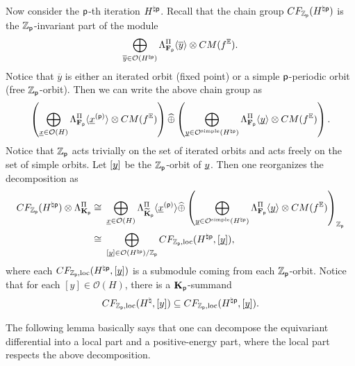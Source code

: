 \documentclass[reqno, 10pt]{amsart}
\numberwithin{equation}{section}
\numberwithin{equation}{section}
\renewcommand{\subset}{\subseteq}
\theoremstyle{definition}
\theoremstyle{remark}
\newcommand{\beqn}{\begin{equation*}}
\newcommand{\eeqn}{\end{equation*}}
\newcommand{\ov}{\overline}
\newcommand{\mb}{\mathbb}
\newcommand{\mc}{\mathcal}
\newcommand{\p}{{\sf p}}
\newcommand{\fp}{{\bf F}_{\sf p}}
\newcommand{\kp}{{\bf K}_{\sf p}}
\newcommand{\tkp}{\wt{\bf K}_{\sf p}}
\newcommand{\zp}{{{\mb Z}_{\sf p}}}
\newcommand{\ep}{{{\mathbb E}}}
\newcommand{\wt}{\widetilde}
\newcommand{\wh}{\widehat}
\newcommand{\uds}[1]{\underline{\smash{#1}}}
\begin{document}
Now consider the $\p$-th iteration $H^{\natural \p}$. Recall that the chain group $CF_{\zp}(H^{\natural \p})$ is the $\zp$-invariant part of the module
\beqn
\bigoplus_{ \ov{y} \in {\mc O}(H^{\natural \p})} \Lambda_{\fp}^\Pi \langle \ov{y} \rangle \otimes CM(f^\ep). 
\eeqn
Notice that $\ov{y}$ is either an iterated orbit (fixed point) or a simple $\p$-periodic orbit (free $\zp$-orbit). Then we can write the above chain group as
\beqn
\left(  \bigoplus_{ \uds{x} \in {\mc O}(H)} \Lambda_{\fp}^\Pi \langle \uds x^{(\p)} \rangle \otimes CM(f^\ep) \right) \wh \oplus \left(  \bigoplus_{\uds y \in {\mc O}^{\rm simple}(H^{\natural \p})} \Lambda_{\fp}^\Pi \langle \uds y \rangle \otimes CM(f^\ep)\right).
\eeqn
Notice that $\zp$ acts trivially on the set of iterated orbits and acts freely on the set of simple orbits. Let $[\uds y]$ be the $\zp$-orbit of $\uds y$. Then one reorganizes the decomposition as 
\beqn
\begin{split}
CF_{\zp}(H^{\natural \p}) \otimes \Lambda_{\kp}^\Pi \cong &\ \bigoplus_{\uds x \in {\mc O}(H)} \Lambda_{\tkp}^\Pi \langle \uds x^{(\p)} \rangle \wh \oplus \left( \bigoplus_{\uds y \in {\mc O}^{\rm simple}(H^{\natural \p})} \Lambda_{\fp}^\Pi \langle \uds y \rangle \otimes CM(f^\ep) \right)_{\zp}\\
\cong &\ \bigoplus_{[\uds y]\in {\mc O}(H^{\natural \p})/ \zp} CF_{\zp, {\rm loc}}( H^{\natural \p}, [\uds y] ),
\end{split}
\eeqn
where each $CF_{\zp, {\rm loc}}(H^{\natural \p}, [\uds y])$ is a submodule coming from each $\zp$-orbit. Notice that for each $[y] \in {\mc O}(H)$, there is a $\kp$-summand
\beqn
CF_{\zp, {\rm loc}}(H^{\natural}, [y]) \subset CF_{\zp, {\rm loc}}(H^{\natural \p}, [\uds y]).
\eeqn

The following lemma basically says that one can decompose the equivariant differential into a local part and a positive-energy part, where the local part respects the above decomposition.  
\end{document}
